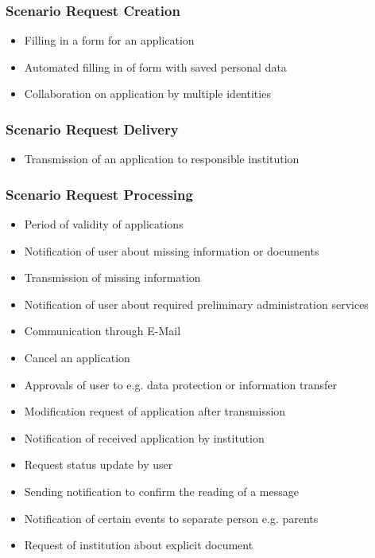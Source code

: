 \documentclass[
     12pt,         %
     a4paper,      %
     BCOR=10mm,version=first,     %
     DIV=14,version=first,        %
     ]{scrreprt}
\begin{document}
\subsubsection{Scenario Request Creation}
\begin{itemize}
    \item Filling in a form for an application
    \item Automated filling in of form with saved personal data
    \item Collaboration on application by multiple identities
\end{itemize}

\subsubsection{Scenario Request Delivery}
\begin{itemize}
    \item Transmission of an application to responsible institution
\end{itemize}

\subsubsection{Scenario Request Processing}
\begin{itemize}
    \item Period of validity of applications
    \item Notification of user about missing information or documents
    \item Transmission of missing information
    \item Notification of user about required preliminary administration services
    \item Communication through E-Mail
    \item Cancel an application
    \item Approvals of user to e.g. data protection or information transfer
    \item Modification request of application after transmission
    \item Notification of received application by institution
    \item Request status update by user
    \item Sending notification to confirm the reading of a message
    \item Notification of certain events to separate person e.g. parents
    \item Request of institution about explicit document
\end{itemize}
\end{document}

